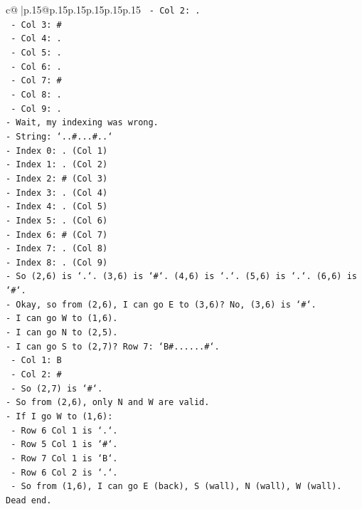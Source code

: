 \documentclass{article}
\begin{document}
{\begin{supertabular}{c@{$\;$}|p{.15\linewidth}@{}p{.15\linewidth}p{.15\linewidth}p{.15\linewidth}p{.15\linewidth}p{.15\linewidth}}
{{{\texttt{  {-} Col 2: .} \\
\texttt{  {-} Col 3: \#} \\
\texttt{  {-} Col 4: .} \\
\texttt{  {-} Col 5: .} \\
\texttt{  {-} Col 6: .} \\
\texttt{  {-} Col 7: \#} \\
\texttt{  {-} Col 8: .} \\
\texttt{  {-} Col 9: .} \\
\texttt{{-} Wait, my indexing was wrong.} \\
\texttt{{-} String: `..\#...\#..`} \\
\texttt{{-} Index 0: . (Col 1)} \\
\texttt{{-} Index 1: . (Col 2)} \\
\texttt{{-} Index 2: \# (Col 3)} \\
\texttt{{-} Index 3: . (Col 4)} \\
\texttt{{-} Index 4: . (Col 5)} \\
\texttt{{-} Index 5: . (Col 6)} \\
\texttt{{-} Index 6: \# (Col 7)} \\
\texttt{{-} Index 7: . (Col 8)} \\
\texttt{{-} Index 8: . (Col 9)} \\
\texttt{{-} So (2,6) is `.`. (3,6) is `\#`. (4,6) is `.`. (5,6) is `.`. (6,6) is `\#`.} \\
\texttt{{-} Okay, so from (2,6), I can go E to (3,6)? No, (3,6) is `\#`.} \\
\texttt{{-} I can go W to (1,6).} \\
\texttt{{-} I can go N to (2,5).} \\
\texttt{{-} I can go S to (2,7)? Row 7: `B\#......\#`.} \\
\texttt{  {-} Col 1: B} \\
\texttt{  {-} Col 2: \#} \\
\texttt{  {-} So (2,7) is `\#`.} \\
\texttt{{-} So from (2,6), only N and W are valid.} \\
\texttt{{-} If I go W to (1,6):} \\
\texttt{  {-} Row 6 Col 1 is `.`.} \\
\texttt{  {-} Row 5 Col 1 is `\#`.} \\
\texttt{  {-} Row 7 Col 1 is `B`.} \\
\texttt{  {-} Row 6 Col 2 is `.`.} \\
\texttt{  {-} So from (1,6), I can go E (back), S (wall), N (wall), W (wall). Dead end.} \\
}}}
\end{supertabular}}
\end{document}
